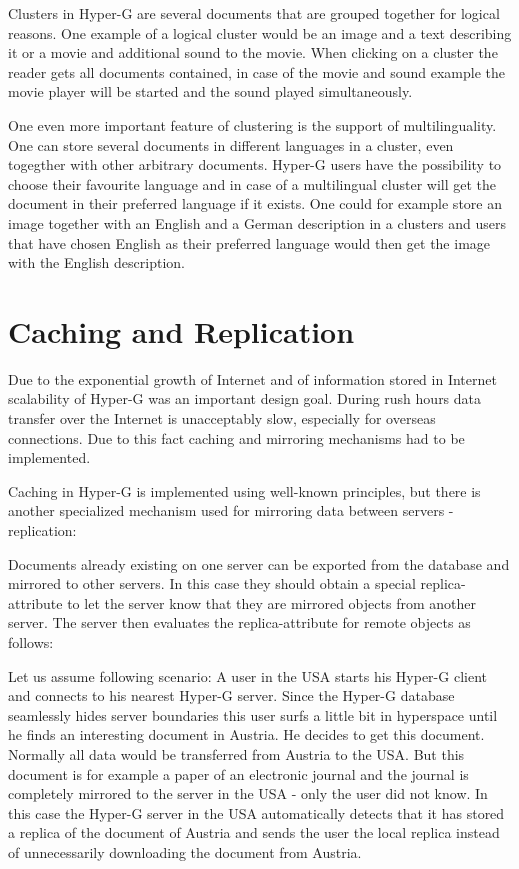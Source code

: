 Clusters in Hyper-G are several documents that are grouped together
for logical reasons. One example of a logical cluster would be an
image and a text describing it or a movie and additional sound to the
movie. When clicking on a cluster the reader gets all documents
contained, in case of the movie and sound example the movie player
will be started and the sound played simultaneously.

One even more important feature of clustering is the support of
multilinguality. One can store several documents in different
languages in a cluster, even togegther with other arbitrary
documents. Hyper-G users have the possibility to choose their
favourite language and in case of a multilingual cluster will get the
document in their preferred language if it exists. One could for
example store an image together with an English and a German
description in a clusters and users that have chosen English as their
preferred language would then get the image with the English
description.

\section{Caching and Replication}

Due to the exponential growth of Internet and of information stored in
Internet scalability of Hyper-G was an important design goal. During
rush hours data transfer over the Internet is unacceptably slow,
especially for overseas connections. Due to this fact caching and
mirroring mechanisms had to be implemented.

Caching in Hyper-G is implemented using well-known principles, but
there is another specialized mechanism used for mirroring data between
servers - replication:

Documents already existing on one server can be exported from the
database and mirrored to other servers. In this case they should
obtain a special replica-attribute to let the server know that they
are mirrored objects from another server. The server then evaluates
the replica-attribute for remote objects as follows:

Let us assume following scenario: A user in the USA starts his Hyper-G
client and connects to his nearest Hyper-G server. Since the Hyper-G
database seamlessly hides server boundaries this user surfs a little
bit in hyperspace until he finds an interesting document in
Austria. He decides to get this document. Normally all data would be
transferred from Austria to the USA. But this document is for example
a paper of an electronic journal and the journal is completely
mirrored to the server in the USA - only the user did not know. In
this case the Hyper-G server in the USA automatically detects that it
has stored a replica of the document of Austria and sends the user the
local replica instead of unnecessarily downloading the document from
Austria.

